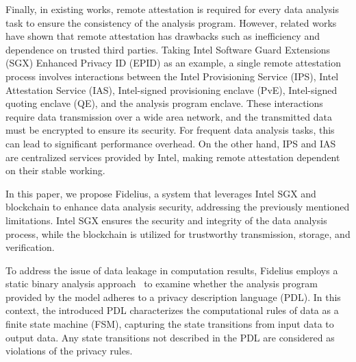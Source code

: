 Finally, in existing works, remote attestation is required for every data analysis task to ensure the consistency of the analysis program. However, related works~\cite{chen2019opera,chen2022mage} have shown that remote attestation has drawbacks such as inefficiency and dependence on trusted third parties.
Taking Intel Software Guard Extensions (SGX) Enhanced Privacy ID (EPID) as an example, a single remote attestation process involves interactions between the Intel Provisioning Service (IPS), Intel Attestation Service (IAS), Intel-signed provisioning enclave (PvE), Intel-signed quoting enclave (QE), and the analysis program enclave. These interactions require data transmission over a wide area network, and the transmitted data must be encrypted to ensure its security. For frequent data analysis tasks, this can lead to significant performance overhead. On the other hand, IPS and IAS are centralized services provided by Intel, making remote attestation dependent on their stable working.

In this paper, we propose Fidelius, a system that leverages Intel SGX and blockchain to enhance data analysis security, addressing the previously mentioned limitations.
Intel SGX ensures the security and integrity of the data analysis process, while the blockchain is utilized for trustworthy transmission, storage, and verification.

To address the issue of data leakage in computation results, Fidelius employs a static binary analysis approach~\cite{schulte2019gtirb} to examine whether the analysis program provided by the model adheres to a privacy description language (PDL). In this context, the introduced PDL characterizes the computational rules of data as a finite state machine (FSM), capturing the state transitions from input data to output data. Any state transitions not described in the PDL are considered as violations of the privacy rules.

